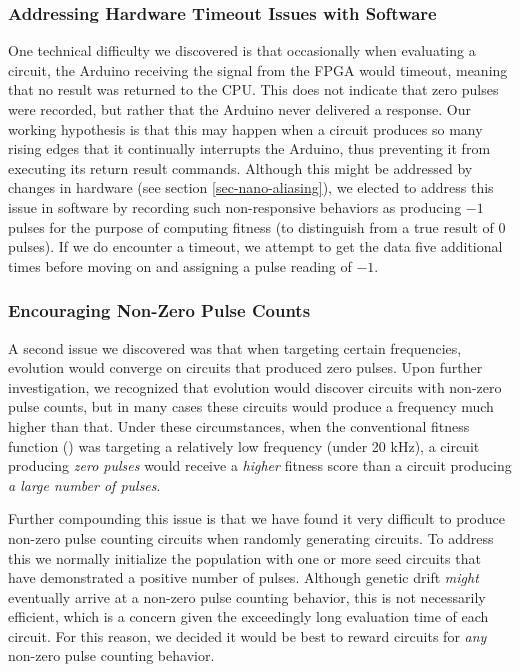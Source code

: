 \documentclass{ieeeaccess}
\newcommand{\highlight}[1]{#1}
\begin{document}
\subsubsection{Addressing Hardware Timeout Issues with Software}
One technical difficulty we discovered is that occasionally when evaluating a circuit, the Arduino receiving the signal from the FPGA would timeout, meaning that no result was returned to the CPU. This does not indicate that zero pulses were recorded, but rather that the Arduino never delivered a response. Our working hypothesis is that this may happen when a circuit produces so many rising edges that it continually interrupts the Arduino, thus preventing it from executing its return result commands. Although this might be addressed by changes in hardware (see section \ref{sec-nano-aliasing}), we elected to address this issue in software by recording such non-responsive behaviors as producing $-1$ pulses for the purpose of computing fitness \highlight{(to distinguish from a true result of 0 pulses)}.  If we do encounter a timeout, we attempt to get the data five additional times before moving on and assigning a pulse reading of $-1$. 



\subsubsection{Encouraging Non-Zero Pulse Counts}
A second issue we discovered was that when targeting certain frequencies, evolution would converge on circuits that produced zero pulses. Upon further investigation, we recognized that evolution would discover circuits with non-zero pulse counts, but in many cases these circuits would produce a frequency much higher than that. Under these circumstances, when the conventional fitness function (\cite{Thompson1998OnEvolution,Whitley2021ResurrectingHardware}) was targeting a relatively low frequency (under 20 kHz), a circuit producing \textit{zero pulses} would receive a \textit{higher} fitness score than a circuit producing \textit{a large number of pulses}.

Further compounding this issue is that we have found it very difficult to produce non-zero pulse counting circuits when randomly generating circuits. To address this we normally initialize the population with one or more seed circuits that have demonstrated a positive number of pulses. Although genetic drift \textit{might} eventually arrive at a non-zero pulse counting behavior, this is not necessarily efficient, which is a concern given the exceedingly long evaluation time of each circuit. For this reason, we decided it would be best to reward circuits for \textit{any} non-zero pulse counting behavior.
\end{document}
